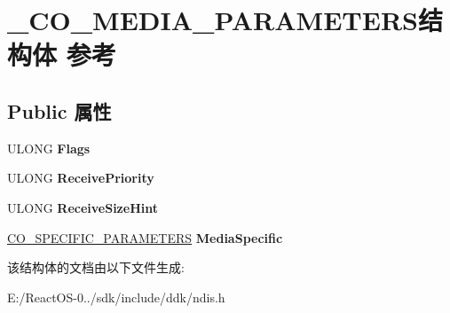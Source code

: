 \hypertarget{struct___c_o___m_e_d_i_a___p_a_r_a_m_e_t_e_r_s}{}\section{\+\_\+\+C\+O\+\_\+\+M\+E\+D\+I\+A\+\_\+\+P\+A\+R\+A\+M\+E\+T\+E\+R\+S结构体 参考}
\label{struct___c_o___m_e_d_i_a___p_a_r_a_m_e_t_e_r_s}
\subsection*{Public 属性}
\begin{DoxyCompactItemize}
\item 
\mbox{\label{struct___c_o___m_e_d_i_a___p_a_r_a_m_e_t_e_r_s_a0a9218ef6bb9bb3113569b0c8e8f6b7f}} 
U\+L\+O\+NG {\bfseries Flags}
\item 
\mbox{\label{struct___c_o___m_e_d_i_a___p_a_r_a_m_e_t_e_r_s_ac8600e644ca9d2acd99fd89356ff9152}} 
U\+L\+O\+NG {\bfseries Receive\+Priority}
\item 
\mbox{\label{struct___c_o___m_e_d_i_a___p_a_r_a_m_e_t_e_r_s_ac51e3b4fd1adedccee96deb77f1b6a35}} 
U\+L\+O\+NG {\bfseries Receive\+Size\+Hint}
\item 
\mbox{\label{struct___c_o___m_e_d_i_a___p_a_r_a_m_e_t_e_r_s_af57b303c60fb7e2246dc3d110ceadd44}} 
\hyperlink{struct___c_o___s_p_e_c_i_f_i_c___p_a_r_a_m_e_t_e_r_s}{C\+O\+\_\+\+S\+P\+E\+C\+I\+F\+I\+C\+\_\+\+P\+A\+R\+A\+M\+E\+T\+E\+RS} {\bfseries Media\+Specific}
\end{DoxyCompactItemize}


该结构体的文档由以下文件生成\+:\begin{DoxyCompactItemize}
\item 
E\+:/\+React\+O\+S-\/0../sdk/include/ddk/ndis.\+h\end{DoxyCompactItemize}
